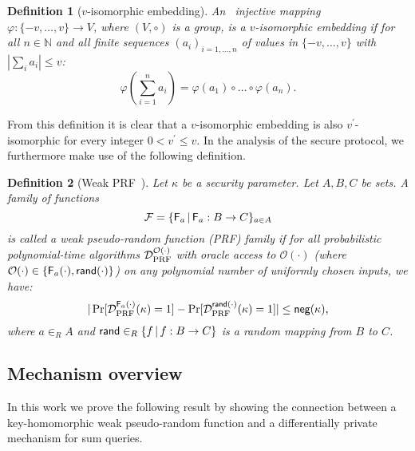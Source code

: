 \documentclass[10pt]{extarticle}
\newtheorem{Def}{Definition}
\begin{document}
\begin{Def}[$v$-isomorphic embedding] An \,\,\,injec\-tive mapping $\varphi:\{-v,\ldots,v\}\to V$, where $(V,\circ)$ is a group, is a $v$-isomorphic embedding if for all $n\in\mathbb{N}$ and all finite sequences $(a_i)_{i=1,\ldots,n}$ of values in $\{-v,\ldots,v\}$ with $\left|\sum_i a_i\right|\leq v$:
\[\varphi\left(\sum_{i=1}^n a_i\right)=\varphi(a_1)\circ\ldots\circ\varphi(a_n).\]
\end{Def}

From this definition it is clear that a $v$-isomorphic embedding is also $v^\prime$-isomorphic for every integer $0<v^\prime\leq v$. In the analysis of the secure protocol, we furthermore make use of the following definition.

\begin{Def}[Weak PRF~\cite{26}] Let $\kappa$ be a security parameter. Let $A,B,C$ be sets. A family of functions 
\[\mathcal{F}=\{\text{\upshape\sffamily F}_a\,|\,\text{\upshape\sffamily F}_a: B\to C\}_{a\in A}\] 
is called a weak pseudo-random function (PRF) family if for all probabilistic polynomial-time algorithms $\mathcal{D}_{\mbox{\scriptsize PRF}}^{\mathcal{O}(\cdot)}$ with oracle access to $\mathcal{O}(\cdot)$ (where $\mathcal{O}(\cdot)\in\{\text{\upshape\sffamily F}_a(\cdot),\text{\upshape\sffamily rand}(\cdot)\}$) on any polynomial number of uniformly chosen inputs, we have:
\[|\Pr[\mathcal{D}_{\mbox{\scriptsize PRF}}^{\text{\upshape\sffamily F}_a(\cdot)}(\kappa)=1]-\Pr[\mathcal{D}_{\mbox{\scriptsize PRF}}^{\text{\upshape\sffamily rand}(\cdot)}(\kappa)=1]|\leq\text{\upshape\sffamily neg}(\kappa),\]
where $a\in_R A$ and $\text{\upshape\sffamily rand}\in_R\{f\,|\,f:B\to C\}$ is a random mapping from $B$ to $C$.
\end{Def}



















\subsection{Mechanism overview}\label{mechov}

In this work we prove the following result by showing the connection between a key-homomorphic weak pseudo-random function and a differentially private mechanism for sum queries.
\end{document}
